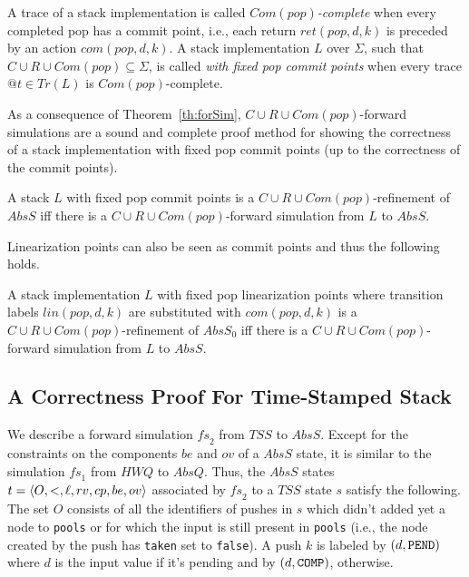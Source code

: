 A trace of a stack implementation is called \emph{$Com(pop)$-complete} when every completed pop has a commit point, i.e., each return $ret(pop,d,k)$ is preceded by an action $com(pop,d,k)$. A stack implementation $L$ over $\Sigma$, such that $C\cup R\cup Com(pop)\subseteq \Sigma$, is called \emph{with fixed pop commit points} when every trace $@t\in Tr(L)$ is $Com(pop)$-complete.


As a consequence of Theorem~\ref{th:forSim}, $C\cup R\cup Com(pop)$-forward simulations are a sound and complete proof method for showing the correctness of a stack implementation with fixed pop commit points (up to the correctness of the commit points). 


\vspace{-1.5mm}
\begin{corollary}
A stack $L$ with fixed pop commit points is a $C\cup R\cup Com(pop)$-refinement of $AbsS$ if{f} there is a $C\cup R\cup Com(pop)$-forward simulation from $L$ to $AbsS$.
\vspace{-1.5mm}
\end{corollary}

Linearization points can also be seen as commit points and thus the following holds.

\vspace{-1.5mm}
\begin{corollary}
A stack implementation $L$ with fixed pop linearization points where transition labels $lin(pop,d,k)$ are substituted with $com(pop,d,k)$ is a $C\cup R\cup Com(pop)$-refinement of $AbsS_0$ if{f} there is a $C\cup R\cup Com(pop)$-forward simulation from $L$ to $AbsS$.
\vspace{-1.5mm}
\end{corollary}


\vspace{-6mm}
\subsection{A Correctness Proof For Time-Stamped Stack}
\vspace{-1mm}
We describe a forward simulation $\mathit{fs}_2$ from $\mathit{TSS}$ to $AbsS$. Except for the constraints on the components $be$ and $ov$ of a $AbsS$ state, it is similar to the simulation $\mathit{fs}_1$ from $\mathit{HWQ}$ to $AbsQ$. Thus, the $AbsS$ states $t=\langle {O,<,\ell,rv,cp,be,ov} \rangle$ associated by $\mathit{fs}_2$ to a $\mathit{TSS}$ state $s$ satisfy the following. The set $O$ consists of all the identifiers of pushes in $s$ which didn't added yet a node to {\tt pools} or for which the input is still present in {\tt pools} (i.e., the node created by the push has {\tt taken} set to {\tt false}). A push $k$ is labeled by $(d,{\tt PEND})$ where $d$ is the input value if it's pending and by $(d,{\tt COMP})$, otherwise. 

